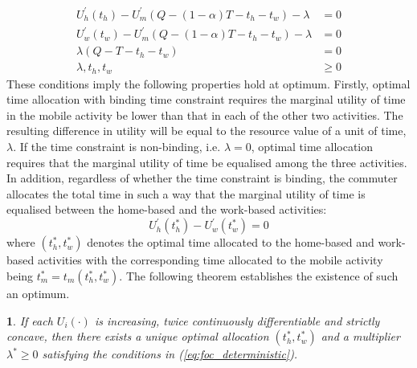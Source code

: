 \documentclass[12pt,a4paper,british]{article}
\theoremstyle{definition}
\theoremstyle{plain}
\newtheorem{thm}{\protect\theoremname}
\theoremstyle{plain}
\theoremstyle{plain}
\providecommand{\theoremname}{Theorem}
\begin{document}
\begin{equation}
\begin{aligned}U_{h}^{\prime}\left(t_{h}\right)-U_{m}^{\prime}\left(Q-\left(1-\alpha\right)T-t_{h}-t_{w}\right)-\lambda & =0\\
U_{w}^{\prime}\left(t_{w}\right)-U_{m}^{\prime}\left(Q-\left(1-\alpha\right)T-t_{h}-t_{w}\right)-\lambda & =0\\
\lambda\left(Q-T-t_{h}-t_{w}\right) & =0\\
\lambda,t_{h},t_{w} & \geq0
\end{aligned}
\label{eq:foc_deterministic}
\end{equation}
These conditions imply the following properties hold at optimum. Firstly, optimal time allocation with binding time constraint requires the marginal utility of time in the mobile activity be lower than that in each of the other two activities. The resulting difference in utility will be equal to the resource value of a unit of time, $\lambda$. If the time constraint is non-binding, i.e. $\lambda=0$, optimal time allocation requires that the marginal utility of time be equalised among the three activities. In addition, regardless of whether the time constraint is binding, the commuter allocates the total time in such a way that the marginal utility of time is equalised between the home-based and the work-based activities:%
\begin{equation}
U_{h}^{\prime}\left(t_{h}^{\ast}\right)-U_{w}^{\prime}\left(t_{w}^{\ast}\right)=0\label{eq:Uh_eq_Uw}
\end{equation}%
where $\left(t_{h}^{\ast},t_{w}^{\ast}\right)$ denotes the optimal time allocated to the home-based and work-based activities with the corresponding time allocated to the mobile activity being $t_{m}^{\ast}=t_{m}\left(t_{h}^{\ast},t_{w}^{\ast}\right)$. The following theorem establishes the existence of such an optimum.
\begin{thm}
If each $U_{i}\left(\cdot\right)$ is increasing, twice continuously differentiable and strictly concave, then there exists a unique optimal allocation $\left(t_{h}^{\ast},t_{w}^{\ast}\right)$ and a multiplier \textup{$\lambda^{\ast}\geq0$} satisfying the conditions in (\ref{eq:foc_deterministic}).
\end{thm}
\end{document}
